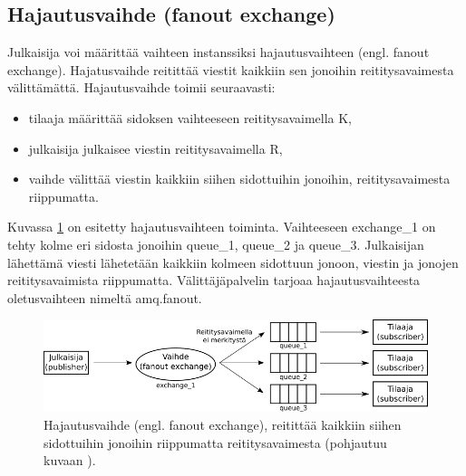 \subsection{Hajautusvaihde (fanout exchange)}
Julkaisija voi määrittää vaihteen instanssiksi hajautusvaihteen (engl. fanout exchange). Hajatusvaihde reitittää viestit kaikkiin sen jonoihin reititysavaimesta välittämättä. Hajautusvaihde toimii seuraavasti:
\begin{itemize}
	\item tilaaja määrittää sidoksen vaihteeseen reititysavaimella K,
	\item julkaisija julkaisee viestin reititysavaimella R,
	\item vaihde välittää viestin kaikkiin siihen sidottuihin jonoihin, reititysavaimesta riippumatta.
\end{itemize}
Kuvassa \ref{fig:amqp-fanout-exchange} on esitetty hajautusvaihteen toiminta. Vaihteeseen exchange\_1 on tehty kolme eri sidosta jonoihin queue\_1, queue\_2 ja queue\_3. Julkaisijan lähettämä viesti lähetetään kaikkiin kolmeen sidottuun jonoon, viestin ja jonojen reititysavaimista riippumatta. Välittäjäpalvelin tarjoaa hajautusvaihteesta oletusvaihteen nimeltä amq.fanout. \cite[s.~27]{AMQP-specification}

\begin{figure}[ht!]
	\includegraphics[width=1\textwidth]{pictures/amqp-fanout-exchange.png}
	\caption{Hajautusvaihde (engl. fanout exchange), reitittää kaikkiin siihen sidottuihin jonoihin riippumatta reititysavaimesta (pohjautuu kuvaan \cite{RabbitMQ-AMQP-0-9-1-Model-Explained}).}
	\label{fig:amqp-fanout-exchange}
\end{figure}


